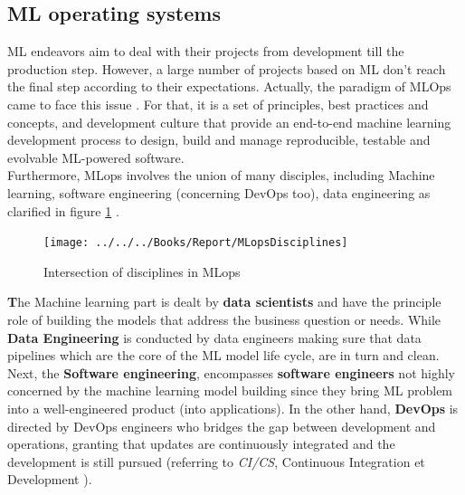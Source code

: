 \documentclass[12pt,a4paper, oneside]{book}
\begin{document}
\subsection{\large  ML operating systems} 
ML endeavors aim to deal with their projects from development till the production step. However, a large number of projects based on ML don't reach the final step according to their expectations. Actually, the paradigm of MLOps came to face this issue \citep{kreuzberger2023machine}. For that, it is a set of principles, best practices and concepts, and development culture that provide an end-to-end machine learning development process to design, build and manage reproducible, testable and evolvable ML-powered software. \\

Furthermore, MLops involves the union of many disciples, including Machine learning, software engineering (concerning DevOps too), data engineering as clarified in figure \ref{fig:mlopsdisciplines} .
\begin{figure}[h!]
	\centering
	\texttt{[image: ../../../Books/Report/MLopsDisciplines]}
	\caption{Intersection of disciplines in MLops \citep{mlopIntersertion}} 
	 \label{fig:mlopsdisciplines}
\end{figure} 

\textbf The {Machine learning part} is dealt by \textbf{data scientists} and have the principle role of building the models that address the business question or needs. While \textbf{Data Engineering} is conducted by data engineers making sure that data pipelines which are the core of the ML model life cycle, are in turn and clean. Next, the \textbf{Software engineering}, encompasses \textbf{software engineers} not highly concerned by the machine learning model building since they bring ML problem into a well-engineered product (into applications). 
In the other hand, \textbf{DevOps} is directed by DevOps engineers who bridges the gap between development and operations, granting that updates are continuously integrated and the development is still pursued (referring to \textit{CI/CS}, Continuous Integration et Development ). \\
\end{document}
